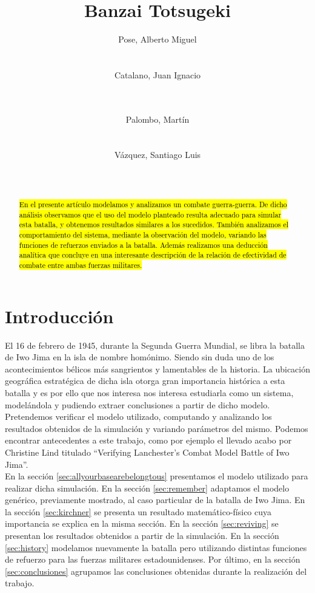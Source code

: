 \documentclass{sig-alternate}
\title{Banzai Totsugeki}
\author{
\alignauthor
Pose, Alberto Miguel\\
       \affaddr{Instituto Tecnológico de Buenos Aires}\\
       \affaddr{Buenos Aires, Argentina}\\
       \email{apose@alu.itba.edu.ar}
\alignauthor
Catalano, Juan Ignacio\\
       \affaddr{Instituto Tecnológico de Buenos Aires}\\
       \affaddr{Buenos Aires, Argentina}\\
       \email{jcatalan@alu.itba.edu.ar}
\and
\alignauthor 
Palombo, Martín\\
       \affaddr{Instituto Tecnológico de Buenos Aires}\\
       \affaddr{Buenos Aires, Argentina}\\
       \email{mpalombo@alu.itba.edu.ar}
\alignauthor 
Vázquez, Santiago Luis\\
       \affaddr{Instituto Tecnológico de Buenos Aires}\\
       \affaddr{Buenos Aires, Argentina}\\
       \email{savazque@alu.itba.edu.ar}
}
\date{}
\begin{document}
\maketitle

\begin{abstract}
\hl{En el presente art\'iculo modelamos y analizamos un combate guerra-guerra. De dicho an\'alisis observamos que el uso del modelo planteado
resulta adecuado para simular esta batalla, y obtenemos resultados similares a los sucedidos. Tambi\'en analizamos el comportamiento del sistema,
mediante la observaci\'on del modelo, variando las funciones de refuerzos enviados a la batalla. Adem\'as realizamos una deducci\'on anal\'itica que
concluye en una interesante descripci\'on de la relaci\'on de efectividad de combate entre ambas fuerzas militares.}
\end{abstract} 

\newpage

\section{Introducci\'on}

El 16 de febrero de 1945, durante la Segunda Guerra Mundial, se libra la batalla de Iwo Jima en la isla de nombre homónimo. 
Siendo sin duda uno de los acontecimientos bélicos más sangrientos y lamentables de la historia. La ubicación geográfica estratégica de dicha
isla otorga gran importancia histórica a esta batalla y es por ello que nos interesa nos interesa estudiarla como un sistema, modelándola y 
pudiendo extraer conclusiones a partir de dicho modelo. Pretendemos verificar el modelo utilizado,
computando y analizando los resultados obtenidos de la simulación y variando parámetros del mismo. Podemos encontrar antecedentes a este 
trabajo, como por ejemplo el llevado acabo por Christine Lind titulado ``Verifying Lanchester’s Combat Model Battle of Iwo Jima''. \\ 
En la secci\'on \ref{sec:allyourbasearebelongtous} presentamos el modelo utilizado para realizar dicha simulaci\'on. En la secci\'on \ref{sec:remember} 
adaptamos el modelo genérico, previamente mostrado, al caso particular de la batalla de Iwo Jima. En la sección \ref{sec:kirchner} se presenta un resultado 
matem\'atico-f\'isico cuya importancia se explica en la misma secci\'on. En la secci\'on \ref{sec:reviving} se presentan los resultados obtenidos a partir de la simulaci\'on. 
En la sección \ref{sec:history} modelamos nuevamente la batalla pero utilizando distintas funciones de refuerzo para las fuerzas militares estadounidenses.
Por \'ultimo, en la secci\'on \ref{sec:conclusiones} agrupamos las conclusiones obtenidas durante la realizaci\'on del trabajo.
\end{document}
